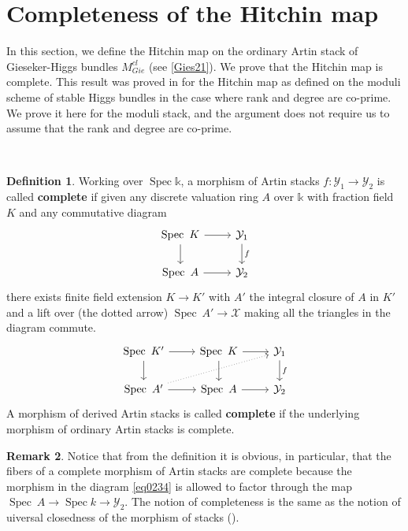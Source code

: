 \documentclass[11pt]{amsart}
\DeclareMathOperator{\Spec}{Spec}
\theoremstyle{plain}
\numberwithin{equation}{section}
\theoremstyle{definition}
\newtheorem{Def}{Definition}[section]
\newtheorem{Rem}[Def]{Remark}
\theoremstyle{plain}
\begin{document}
\section{\textbf{Completeness of the Hitchin map}}
In this section, we define the Hitchin map on the ordinary Artin stack of Gieseker-Higgs bundles $M^{cl}_{Gie}$ (see \ref{Gies21}). We prove that the Hitchin map is complete. This result was proved in \cite{2a} for the Hitchin map as defined on the moduli scheme of stable Higgs bundles in the case where rank and degree are co-prime. We prove it here for the moduli stack, and the argument does not require us to assume that the rank and degree are co-prime.

\

\begin{Def} \cite[p7]{33}
Working over $\Spec \mathbb{k}$, a morphism of Artin stacks $f: \mathcal Y_1\longrightarrow \mathcal Y_2$ is called \textbf{complete} if given any discrete valuation ring $A$ over $\mathbb{k}$ with fraction field $K$ and any commutative diagram 
\begin{equation}
\begin{tikzcd}\label{eq0234}
\Spec~K\arrow{r} \arrow{d} & \mathcal Y_1\arrow["f"]{d}\\
\Spec~A\arrow{r}& \mathcal Y_2
\end{tikzcd}
\end{equation}
there exists finite field extension $K\longrightarrow K'$ with $A'$ the integral closure of $A$ in $K'$ and a lift over (the dotted arrow) $\Spec~A'\longrightarrow \mathcal X$ making all the triangles in the diagram commute.
\begin{equation}
\begin{tikzcd}
\Spec~K'\arrow{r} \arrow{d} & \Spec~K\arrow{r} \arrow{d} & \mathcal Y_1\arrow["f"]{d}\\
\Spec~A'\arrow{r} \arrow[dotted]{urr} & \Spec~A\arrow{r} & \mathcal Y_2
\end{tikzcd}
\end{equation}
A morphism of derived Artin stacks is called \textbf{complete} if the underlying morphism of ordinary Artin stacks is complete.
\end{Def}

\smallskip

\begin{Rem}
    Notice that from the definition it is obvious, in particular, that the fibers of a complete morphism of Artin stacks are complete because the morphism in the diagram \ref{eq0234} is allowed to factor through the map $\Spec~A\to \Spec k\to \mathcal Y_2$. The notion of completeness is the same as the notion of uiversal closedness of the morphism of stacks (\cite[Proposition 26.20.6 (Valuative criterion of universal closedness).]{34}). 
\end{Rem}
\end{document}
